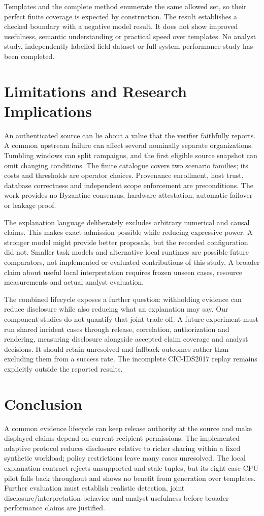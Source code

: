 \documentclass[conference,letterpaper]{IEEEtran}
\begin{document}
Templates and the complete method enumerate the same allowed set, so their perfect finite coverage is expected by construction. The result establishes a checked boundary with a negative model result. It does not show improved usefulness, semantic understanding or practical speed over templates. No analyst study, independently labelled field dataset or full-system performance study has been completed.


\section{Limitations and Research Implications}
An authenticated source can lie about a value that the verifier faithfully reports. A common upstream failure can affect several nominally separate organizations. Tumbling windows can split campaigns, and the first eligible source snapshot can omit changing conditions. The finite catalogue covers two scenario families; its costs and thresholds are operator choices. Provenance enrollment, host trust, database correctness and independent scope enforcement are preconditions. The work provides no Byzantine consensus, hardware attestation, automatic failover or leakage proof.

The explanation language deliberately excludes arbitrary numerical and causal claims. This makes exact admission possible while reducing expressive power. A stronger model might provide better proposals, but the recorded configuration did not. Smaller task models and alternative local runtimes are possible future comparators, not implemented or evaluated contributions of this study. A broader claim about useful local interpretation requires frozen unseen cases, resource measurements and actual analyst evaluation.

The combined lifecycle exposes a further question: withholding evidence can reduce disclosure while also reducing what an explanation may say. Our component studies do not quantify that joint trade-off. A future experiment must run shared incident cases through release, correlation, authorization and rendering, measuring disclosure alongside accepted claim coverage and analyst decisions. It should retain unresolved and fallback outcomes rather than excluding them from a success rate. The incomplete CIC-IDS2017 replay remains explicitly outside the reported results.

\section{Conclusion}
A common evidence lifecycle can keep release authority at the source and make displayed claims depend on current recipient permissions. The implemented adaptive protocol reduces disclosure relative to richer sharing within a fixed synthetic workload; policy restrictions leave many cases unresolved. The local explanation contract rejects unsupported and stale tuples, but its eight-case CPU pilot falls back throughout and shows no benefit from generation over templates. Further evaluation must establish realistic detection, joint disclosure/interpretation behavior and analyst usefulness before broader performance claims are justified.

\end{document}
